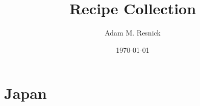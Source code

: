 \documentclass{report}
\title{\bf{Recipe Collection}}
\author{Adam M. Resnick}
\date{\today}
\DeclareRobustCommand{\textfar}{\ensuremath{^{\circ}\mathrm{F}}}
\begin{document}
\maketitle

\tableofcontents

\begin{comment}
\begin{recipe}[%
    preparationtime = {\unit[30]{min}},
    bakingtime={\unit[1]{h}},
    bakingtemperature={\protect\bakingtemperature{
        fanoven=\unit[230]{\textfar},
        topbottomheat=\unit[195]{°C},
        topheat=\unit[195]{°C},
        gasstove=Level 2}},
    portion = {\portion{5-6}},
    calory={\unit[3]{kJ}},
    source = {Somebody you used know}
]
{Test Recipe}

    \introduction{
        \blindtext
    }

    \ingredients{
        2 bar & Dark Chocolate (above \unit[70]{\%})\\
        3 & Eggs\\
        \unit[200]{ml} & Cream\\
        40 g & Sugar\\
        50 g & Butter
    }

    \preparation{
        \step \blindtext
        \step \blindtext
        \step \blindtext
    }

    \suggestion[Headline]{
        \blindtext
    }

    \suggestion{
        \blindtext
    }

    \hint{
        Enjoy typesetting recipes with {\textbf{\Large\LaTeX}} and {\textbf{\Large xcookybooky!}}
    }

\end{recipe}
\end{comment}

\chapter{Japan}

\end{document}
